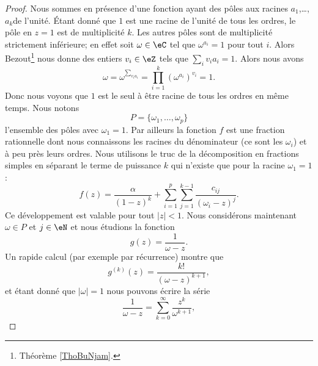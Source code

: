 \begin{proof}
    Nous sommes en présence d'une fonction ayant des pôles aux racines \( a_1\),\ldots, \( a_k\)\Ieme de l'unité. Étant donné que \( 1\) est une racine de l'unité de tous les ordres, le pôle en \( z=1\) est de multiplicité \( k\). Les autres pôles sont de multiplicité strictement inférieure; en effet soit \( \omega\in \eC\) tel que \( \omega^{a_i}=1\) pour tout \( i\). Alors Bezout\footnote{Théorème \ref{ThoBuNjam}.} nous donne des entiers \( v_i\in \eZ\) tels que \( \sum_iv_ia_i=1\). Alors nous avons
    \begin{equation}
        \omega=\omega^{\sum_{v_ia_i}}=\prod_{i=1}^k(\omega^{a_i})^{v_i}=1.
    \end{equation}
    Donc nous voyons que \( 1\) est le seul à être racine de tous les ordres en même temps. Nous notons
    \begin{equation}
        P=\{ \omega_1,\ldots, \omega_p \}
    \end{equation}
    l'ensemble des pôles avec \( \omega_1=1\). Par ailleurs la fonction \( f\) est une fraction rationnelle dont nous connaissons les racines du dénominateur (ce sont les \( \omega_i\)) et à peu près leurs ordres. Nous utilisons le truc de la décomposition en fractions simples
    en séparant le terme de puissance \( k\) qui n'existe que pour la racine \( \omega_1=1\) :
    \begin{equation}    \label{EqDLTJaYr}
        f(z)=\frac{ \alpha }{ (1-z)^k }+\sum_{i=1}^p\sum_{j=1}^{k-1}\frac{ c_{ij} }{ (\omega_i-z)^j }.
    \end{equation}
    Ce développement est valable pour tout \( | z |<1\). Nous considérons maintenant \( \omega\in P\) et \( j\in \eN\) et nous étudions la fonction
    \begin{equation}
        g(z)=\frac{1}{ \omega-z }.
    \end{equation}
    Un rapide calcul (par exemple par récurrence) montre que
    \begin{equation}    \label{EqEJLDIFJ}
        g^{(k)}(z)=\frac{ k! }{ (\omega-z)^{k+1} },
    \end{equation}
    et étant donné que \( | \omega |=1\) nous pouvons écrire la série
    \begin{equation}
        \frac{1}{ \omega-z }=\sum_{k=0}^{\infty}\frac{ z^k }{ \omega^{k+1} },

\end{equation}
\end{proof}
